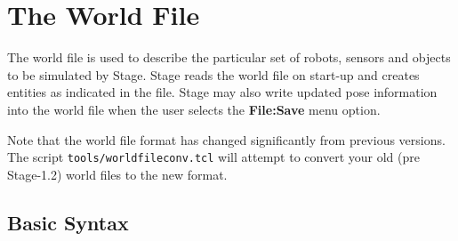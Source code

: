 \documentclass[letter,11pt,twoside]{report}
\begin{document}
\chapter{The World File}
\label{sec:world}

The world file is used to describe the particular set of robots,
sensors and objects to be simulated by Stage.  Stage reads the world
file on start-up and creates entities as indicated in the file.  Stage
may also write updated pose information into the world file when the
user selects the {\bf File:Save} menu option.

Note that the world file format has changed significantly from
previous versions. The script \verb+tools/worldfileconv.tcl+ will
attempt to convert your old (pre Stage-1.2) world files to the new
format.

\section{Basic Syntax}
\end{document}
